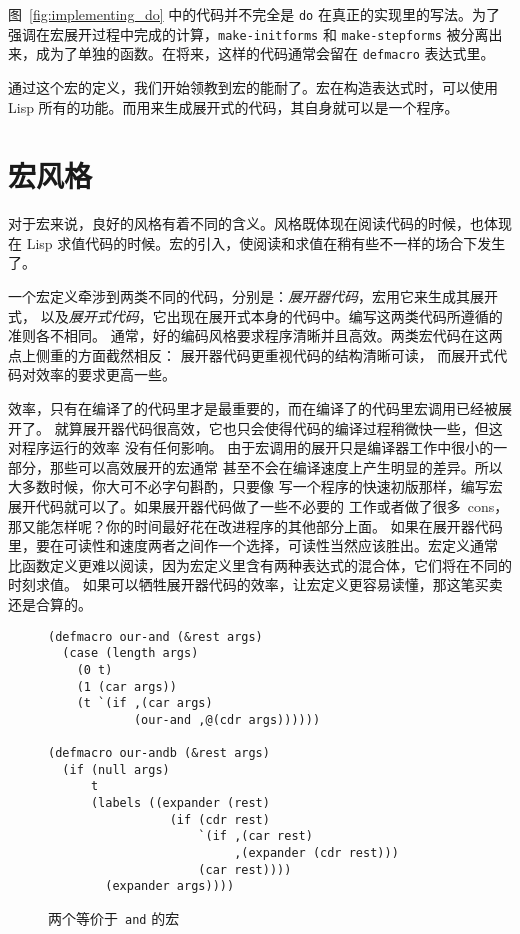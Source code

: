 图~\ref{fig:implementing_do} 中的代码并不完全是 \verb|do| 在真正的实现里的写法。为了强调在宏展开过程中完成的计算，\verb|make-initforms| 和 \verb|make-stepforms| 被分离出来，成为了单独的函数。在将来，这样的代码通常会留在 \verb|defmacro| 表达式里。

通过这个宏的定义，我们开始领教到宏的能耐了。宏在构造表达式时，可以使用 Lisp 所有的功能。而用来生成展开式的代码，其自身就可以是一个程序。

\section{宏风格}
\label{sec:macro_style}

对于宏来说，良好的风格有着不同的含义。风格既体现在阅读代码的时候，也体现在 Lisp 
求值代码的时候。宏的引入，使阅读和求值在稍有些不一样的场合下发生了。

一个宏定义牵涉到两类不同的代码，分别是：\emph{展开器代码}，宏用它来生成其展开式，
以及\emph{展开式代码}，它出现在展开式本身的代码中。编写这两类代码所遵循的准则各不相同。
通常，好的编码风格要求程序清晰并且高效。两类宏代码在这两点上侧重的方面截然相反：
展开器代码更重视代码的结构清晰可读，
而展开式代码对效率的要求更高一些。

效率，只有在编译了的代码里才是最重要的，而在编译了的代码里宏调用已经被展开了。
就算展开器代码很高效，它也只会使得代码的编译过程稍微快一些，但这对程序运行的效率
没有任何影响。
由于宏调用的展开只是编译器工作中很小的一部分，那些可以高效展开的宏通常
甚至不会在编译速度上产生明显的差异。所以大多数时候，你大可不必字句斟酌，只要像
写一个程序的快速初版那样，编写宏展开代码就可以了。如果展开器代码做了一些不必要的
工作或者做了很多~cons，那又能怎样呢？你的时间最好花在改进程序的其他部分上面。
如果在展开器代码里，要在可读性和速度两者之间作一个选择，可读性当然应该胜出。宏定义通常
比函数定义更难以阅读，因为宏定义里含有两种表达式的混合体，它们将在不同的时刻求值。
如果可以牺牲展开器代码的效率，让宏定义更容易读懂，那这笔买卖还是合算的。

\begin{figure}
\begin{lstlisting}
(defmacro our-and (&rest args)
  (case (length args)
    (0 t)
    (1 (car args))
    (t `(if ,(car args)
            (our-and ,@(cdr args))))))

(defmacro our-andb (&rest args)
  (if (null args)
      t
      (labels ((expander (rest)
                 (if (cdr rest)
                     `(if ,(car rest)
                          ,(expander (cdr rest)))
                     (car rest))))
        (expander args))))
\end{lstlisting}
\caption{\label{fig:two_macros_equivalent_to_and}两个等价于~\texttt{and} 的宏}
\end{figure}

